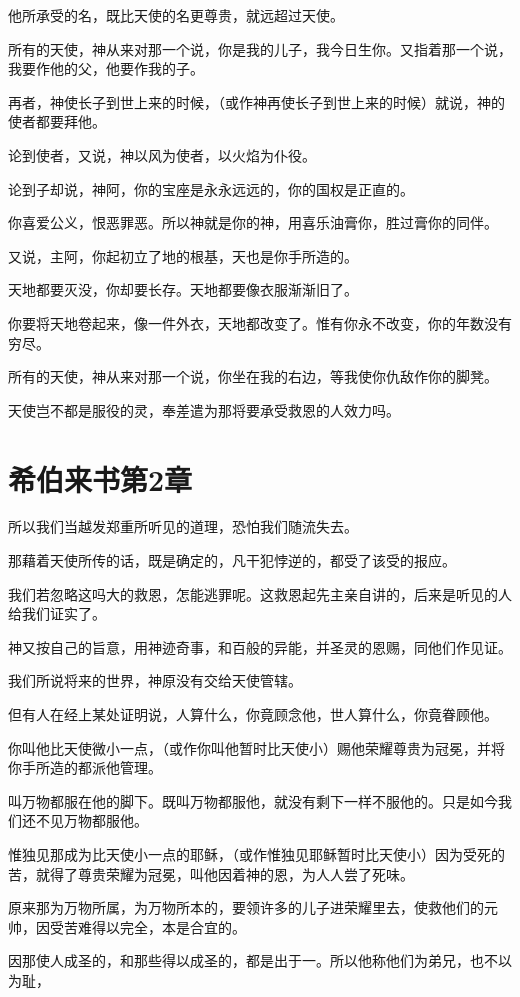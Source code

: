 \documentclass[12pt,oneside]{book}
\begin{document}
他所承受的名，既比天使的名更尊贵，就远超过天使。

所有的天使，神从来对那一个说，你是我的儿子，我今日生你。又指着那一个说，我要作他的父，他要作我的子。

再者，神使长子到世上来的时候，（或作神再使长子到世上来的时候）就说，神的使者都要拜他。

论到使者，又说，神以风为使者，以火焰为仆役。

论到子却说，神阿，你的宝座是永永远远的，你的国权是正直的。

你喜爱公义，恨恶罪恶。所以神就是你的神，用喜乐油膏你，胜过膏你的同伴。

又说，主阿，你起初立了地的根基，天也是你手所造的。

天地都要灭没，你却要长存。天地都要像衣服渐渐旧了。

你要将天地卷起来，像一件外衣，天地都改变了。惟有你永不改变，你的年数没有穷尽。

所有的天使，神从来对那一个说，你坐在我的右边，等我使你仇敌作你的脚凳。

天使岂不都是服役的灵，奉差遣为那将要承受救恩的人效力吗。

\chapter{希伯来书第2章}
所以我们当越发郑重所听见的道理，恐怕我们随流失去。

那藉着天使所传的话，既是确定的，凡干犯悖逆的，都受了该受的报应。

我们若忽略这吗大的救恩，怎能逃罪呢。这救恩起先主亲自讲的，后来是听见的人给我们证实了。

神又按自己的旨意，用神迹奇事，和百般的异能，并圣灵的恩赐，同他们作见证。

我们所说将来的世界，神原没有交给天使管辖。

但有人在经上某处证明说，人算什么，你竟顾念他，世人算什么，你竟眷顾他。

你叫他比天使微小一点，（或作你叫他暂时比天使小）赐他荣耀尊贵为冠冕，并将你手所造的都派他管理。

叫万物都服在他的脚下。既叫万物都服他，就没有剩下一样不服他的。只是如今我们还不见万物都服他。

惟独见那成为比天使小一点的耶稣，（或作惟独见耶稣暂时比天使小）因为受死的苦，就得了尊贵荣耀为冠冕，叫他因着神的恩，为人人尝了死味。

原来那为万物所属，为万物所本的，要领许多的儿子进荣耀里去，使救他们的元帅，因受苦难得以完全，本是合宜的。

因那使人成圣的，和那些得以成圣的，都是出于一。所以他称他们为弟兄，也不以为耻，
\end{document}
